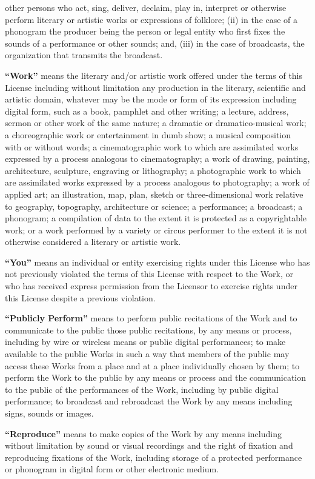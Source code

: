 \begin{doclicense@enumerate}
other persons who act, sing, deliver, declaim, play in,
interpret or otherwise perform literary or artistic works
or expressions of folklore; (ii) in the case of a
phonogram the producer being the person or legal entity
who first fixes the sounds of a performance or other
sounds; and, (iii) in the case of broadcasts, the
organization that transmits the broadcast.
\item \textbf{``Work''} means the literary and/or
artistic work offered under the terms of this License
including without limitation any production in the
literary, scientific and artistic domain, whatever may be
the mode or form of its expression including digital
form, such as a book, pamphlet and other writing; a
lecture, address, sermon or other work of the same
nature; a dramatic or dramatico-musical work; a
choreographic work or entertainment in dumb show; a
musical composition with or without words; a
cinematographic work to which are assimilated works
expressed by a process analogous to cinematography; a
work of drawing, painting, architecture, sculpture,
engraving or lithography; a photographic work to which
are assimilated works expressed by a process analogous to
photography; a work of applied art; an illustration, map,
plan, sketch or three-dimensional work relative to
geography, topography, architecture or science; a
performance; a broadcast; a phonogram; a compilation of
data to the extent it is protected as a copyrightable
work; or a work performed by a variety or circus
performer to the extent it is not otherwise considered a
literary or artistic work.
\item \textbf{``You''} means an individual or entity
exercising rights under this License who has not
previously violated the terms of this License with
respect to the Work, or who has received express
permission from the Licensor to exercise rights under
this License despite a previous violation.
\item \textbf{``Publicly Perform''} means to perform
public recitations of the Work and to communicate to the
public those public recitations, by any means or process,
including by wire or wireless means or public digital
performances; to make available to the public Works in
such a way that members of the public may access these
Works from a place and at a place individually chosen by
them; to perform the Work to the public by any means or
process and the communication to the public of the
performances of the Work, including by public digital
performance; to broadcast and rebroadcast the Work by any
means including signs, sounds or images.
\item \textbf{``Reproduce''} means to make copies of
the Work by any means including without limitation by
sound or visual recordings and the right of fixation and
reproducing fixations of the Work, including storage of a
protected performance or phonogram in digital form or
other electronic medium.
\end{doclicense@enumerate}
